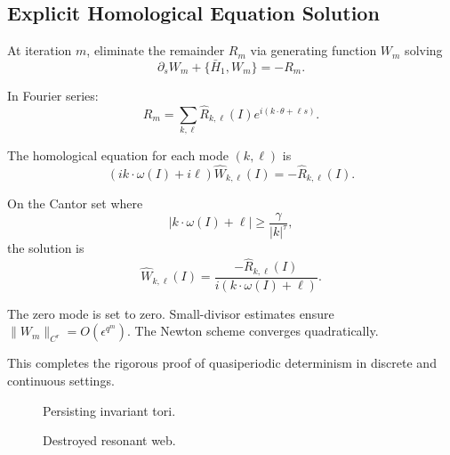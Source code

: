 \documentclass[11pt,a4paper]{article}
\begin{document}
\subsection{Explicit Homological Equation Solution}

At iteration $m$, eliminate the remainder $R_m$ via generating function $W_m$ solving
\[
\partial_s W_m + \{\bar{H}_1, W_m\} = -R_m.
\]

In Fourier series:
\[
R_m = \sum_{k,\ell} \hat{R}_{k,\ell}(I) e^{i(k\cdot\theta + \ell s)}.
\]

The homological equation for each mode $(k,\ell)$ is
\[
(i k \cdot \omega(I) + i \ell) \hat{W}_{k,\ell}(I) = -\hat{R}_{k,\ell}(I).
\]

On the Cantor set where
\[
|k \cdot \omega(I) + \ell| \ge \frac{\gamma}{|k|^\tau},
\]
the solution is
\[
\hat{W}_{k,\ell}(I) = \frac{-\hat{R}_{k,\ell}(I)}{i(k\cdot\omega(I) + \ell)}.
\]

The zero mode is set to zero. Small-divisor estimates ensure $\|W_m\|_{C^r} = O(\epsilon^{q^m})$. The Newton scheme converges quadratically.

This completes the rigorous proof of quasiperiodic determinism in discrete and continuous settings.

\begin{figure}[ht]
\centering
{}
\caption{Persisting invariant tori.}
\label{fig:persisting-tori}
\end{figure}

\begin{figure}[ht]
\centering
{}
\caption{Destroyed resonant web.}
\label{fig:destroyed-resonances}
\end{figure}
\end{document}
